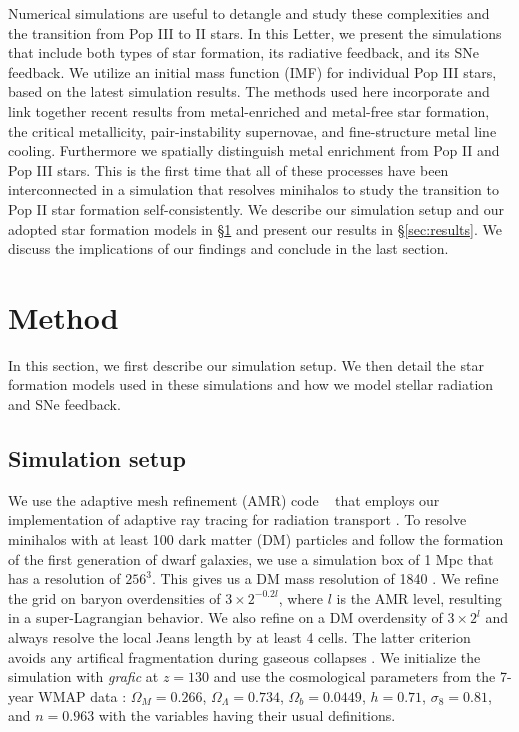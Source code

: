 \documentclass[apjl]{emulateapj}
\begin{document}
Numerical simulations are useful to detangle and study these
complexities and the transition from Pop III to II stars.  In this
Letter, we present the simulations that include both types of star
formation, its radiative feedback, and its SNe feedback.  We utilize
an initial mass function (IMF) for individual Pop III stars, based on
the latest simulation results.  The methods used here incorporate and
link together recent results from metal-enriched and metal-free star
formation, the critical metallicity, pair-instability supernovae, and
fine-structure metal line cooling.  Furthermore we spatially
distinguish metal enrichment from Pop II and Pop III stars.  This is
the first time that all of these processes have been interconnected in
a simulation that resolves minihalos to study the transition to Pop II
star formation self-consistently.  We describe our simulation setup
and our adopted star formation models in \S \ref{sec:setup} and
present our results in \S \ref{sec:results}.  We discuss the
implications of our findings and conclude in the last section.

\section{Method}
\label{sec:setup}

In this section, we first describe our simulation setup.  We then
detail the star formation models used in these simulations and how we
model stellar radiation and SNe feedback.

\subsection{Simulation setup}

We use the adaptive mesh refinement (AMR) code
\enzo~\citep{BryanNorman97, OShea2004} that employs our implementation
of adaptive ray tracing for radiation transport \citep{Wise10}.  To
resolve minihalos with at least 100 dark matter (DM) particles and
follow the formation of the first generation of dwarf galaxies, we use
a simulation box of 1 Mpc that has a resolution of $256^3$.  This
gives us a DM mass resolution of 1840 \Ms.  We refine the grid on
baryon overdensities of $3 \times 2^{-0.2l}$, where $l$ is the AMR
level, resulting in a super-Lagrangian behavior.  We also refine on a
DM overdensity of $3 \times 2^l$ and always resolve the local Jeans
length by at least 4 cells.  The latter criterion avoids any artifical
fragmentation during gaseous collapses \citep{Truelove97}.  We
initialize the simulation with \textsl{grafic} \citep{Bertschinger01}
at $z = 130$ and use the cosmological parameters from the 7-year WMAP
data \citep{WMAP7}: $\Omega_M = 0.266$, $\Omega_\Lambda = 0.734$,
$\Omega_b = 0.0449$, $h = 0.71$, $\sigma_8 = 0.81$, and $n = 0.963$
with the variables having their usual definitions.
\end{document}
